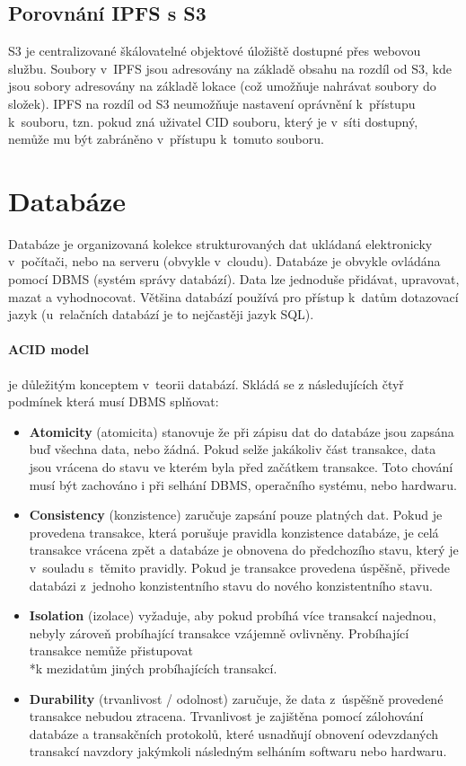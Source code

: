 \documentclass[12pt, a4paper,
  oneside,      %
]{report}
\begin{document}
\subsection{Porovnání IPFS s S3}
S3 je centralizované škálovatelné objektové úložiště dostupné přes webovou službu. Soubory v~IPFS jsou adresovány na základě obsahu na rozdíl od S3, kde jsou sobory adresovány na základě lokace (což umožňuje nahrávat soubory do složek). IPFS na rozdíl od S3 neumožňuje nastavení oprávnění k~přístupu k~souboru, tzn. pokud zná uživatel CID souboru, který je v~síti dostupný, nemůže mu být zabráněno v~přístupu k~tomuto souboru. \cite{whatIsS3}

\section{Databáze}
Databáze je organizovaná kolekce strukturovaných dat ukládaná elektronicky v~počítači, nebo na serveru (obvykle v~cloudu). Databáze je obvykle ovládána pomocí DBMS (systém správy databází). Data lze jednoduše přidávat, upravovat, mazat a vyhodnocovat. Většina databází používá pro přístup k~datům dotazovací jazyk (u~relačních databází je to nejčastěji jazyk SQL). \cite{whatIsDatabase}
\paragraph{ACID model} je důležitým konceptem v~teorii databází. Skládá se z následujících čtyř podmínek která musí DBMS splňovat:
\begin{itemize}
    

\item \textbf{Atomicity} (atomicita) stanovuje že při zápisu dat do databáze jsou zapsána buď všechna data, nebo žádná. Pokud selže jakákoliv část transakce, data jsou vrácena do stavu ve kterém byla před začátkem transakce. Toto chování musí být zachováno i při selhání DBMS, operačního systému, nebo hardwaru. \cite{whatIsACID}
\item \textbf{Consistency} (konzistence) zaručuje zapsání pouze platných dat. Pokud je provedena transakce, která porušuje pravidla konzistence databáze, je celá transakce vrácena zpět a databáze je obnovena do předchozího stavu, který je v~souladu s~těmito pravidly. Pokud je transakce provedena úspěšně, přivede databázi z~jednoho konzistentního stavu do nového konzistentního stavu. \cite{whatIsACID}
\item \textbf{Isolation} (izolace) vyžaduje, aby pokud probíhá více transakcí najednou, nebyly zároveň probíhající transakce vzájemně ovlivněny. Probíhající transakce nemůže přistupovat \\*k mezidatům jiných probíhajících transakcí. \cite{whatIsACID}
\item \textbf{Durability} (trvanlivost / odolnost) zaručuje, že data z~úspěšně provedené transakce nebudou ztracena. Trvanlivost je zajištěna pomocí zálohování databáze a transakčních protokolů, které usnadňují obnovení odevzdaných transakcí navzdory jakýmkoli následným selháním softwaru nebo hardwaru. \cite{whatIsACID}
\end{itemize}
\end{document}
